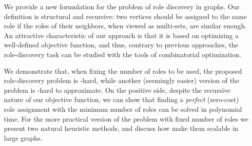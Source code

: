 
We provide a new formulation for the 
problem of role discovery in graphs. 
Our definition is structural and recursive: 
two vertices should be assigned to the same role
if the roles of their neighbors, when viewed as multi-sets, are similar enough.
An attractive characteristic of our approach 
is that it is based on optimizing a well-defined objective function, 
and thus, contrary to previous approaches, 
the role-discovery task can be studied with the tools of combinatorial optimization.

We demonstrate that, when fixing the number of roles to be used, 
the proposed role-discovery problem is \np-hard, 
while another (seemingly easier) version of the problem is \np-hard to approximate.
On the positive side, 
despite the recursive nature of our objective function, 
we can show that finding a \emph{perfect} (zero-cost) role assignment
with the minimum number of roles can be solved in polynomial time. 
For the more practical version of the problem with fixed number of roles
we present two natural heuristic methods, 
and discuss how make them scalable in large graphs.
